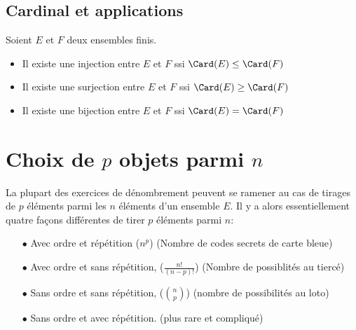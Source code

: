 \documentclass[a4paper, 11pt]{article}
\begin{document}
\subsection{Cardinal et applications}

\begin{prop}
Soient $E$ et $F$ deux ensembles finis. 
\begin{itemize}
\item Il existe une injection entre $E$ et $F$ ssi $\Card(E) \leq \Card(F)$
\item Il existe une surjection entre $E$ et $F$ ssi $\Card(E) \geq \Card(F)$
\item Il existe une bijection entre $E$ et $F$ ssi $\Card(E) = \Card(F)$

\end{itemize}

\end{prop}
 


\section{Choix de $p$ objets parmi $n$}

\noindent La plupart des exercices de d\'enombrement peuvent se ramener au cas de tirages de $p$ \'el\'ements parmi les $n$ \'el\'ements d'un ensemble $E$. Il y a alors essentiellement quatre fa\c{c}ons diff\'erentes de tirer $p$ \'el\'ements parmi $n$:
\begin{itemize}
\item[$\bullet$] Avec ordre et r\'ep\'etition ($n^p$) (Nombre de  codes secrets de carte bleue)
\item[$\bullet$] Avec ordre et sans r\'ep\'etition, ($\frac{n!}{(n-p)!}$) (Nombre de possiblités au tiercé) 
\item[$\bullet$] Sans ordre et sans r\'ep\'etition, ($\binom{n}{p}$) (nombre de possibilités au loto)
\item[$\bullet$] Sans ordre et avec r\'ep\'etition. (plus rare et compliqué) 
\end{itemize}

\end{document}

